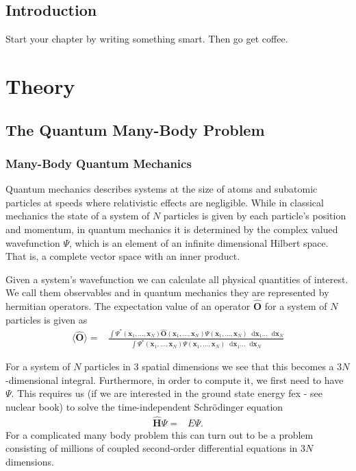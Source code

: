\documentclass[twoside,english]{uiofysmaster}
\newcommand*\dif{\mathop{}\!\mathrm{d}}
\begin{document}
\tableofcontents

\chapter{Introduction}

Start your chapter by writing something smart. Then go get coffee.

\part{Theory}

\chapter{The Quantum Many-Body Problem}

\section{Many-Body Quantum Mechanics}
Quantum mechanics describes systems at the size of atoms and subatomic particles at speeds where relativistic effects are negligible. While in classical mechanics the state of a system of $N$ particles is given by each particle's position and momentum, in quantum mechanics it is determined by the complex valued wavefunction $\Psi$, which is an element of an infinite dimensional Hilbert space. That is, a complete vector space with an inner product.\cite{Kvaal2017}

Given a system's wavefunction we can calculate all physical quantities of interest\cite{Kvaal2017}. We call them observables and in quantum mechanics they are represented by hermitian operators.
The expectation value of an operator $\hat{\bm{O}}$ for a system of $N$ particles is given as \cite{HjortJensen2015}
\begin{align}
	\langle \hat{\bm{O}} \rangle =& \frac{\int \Psi^{\ast}(\bm{x}_1,...,\bm{x}_N) \hat{\bm{O}}(\bm{x}_1,...,\bm{x}_N)
	\Psi (\bm{x}_1,...,\bm{x}_N)
	\dif \bm{x}_1 ... \dif \bm{x}_N  }
	{\int \Psi^{\ast}(\bm{x}_1,...,\bm{x}_N)
	\Psi (\bm{x}_1,...,\bm{x}_N)
	\dif \bm{x}_1 ... \dif \bm{x}_N}
\end{align}

For a system of $N$ particles in 3 spatial dimensions we see that this becomes a $3N$-dimensional integral. Furthermore, in order to compute it, we first need to have $\Psi$. This requires us (if we are interested in the ground state energy fex - see nuclear book) to solve the time-independent Schrödinger equation
\begin{align}
	\hat{\bm{H}} \Psi =& E\Psi .
\end{align}
For a complicated many body problem this can turn out to be a problem consisting of millions of coupled second-order differential equations in $3N$ dimensions.
\end{document}
